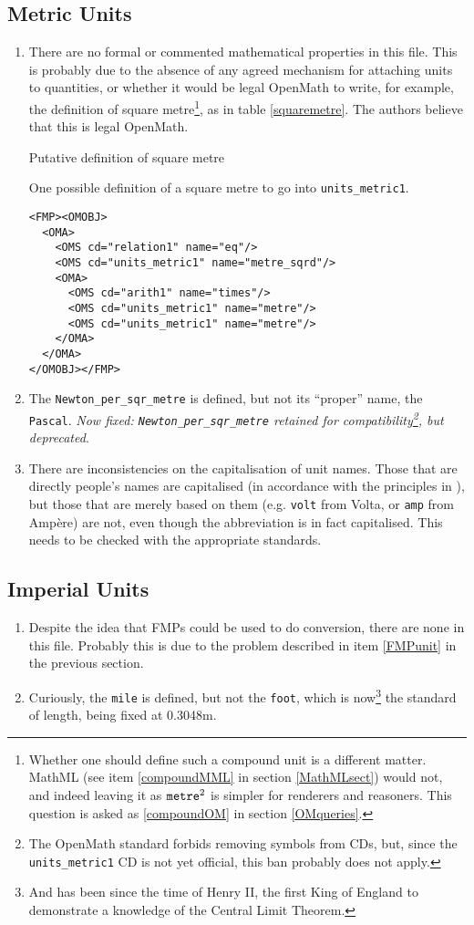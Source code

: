 \documentclass[11pt]{openmathTN}
\def\action#1{\hfill\rlap{\bf #1}}
\begin{document}
\subsection{Metric Units}\label{metricsect}
\begin{enumerate}
\item\label{FMPunit}
There are no formal or commented mathematical properties in this file. This
is probably due to the absence of any agreed mechanism for attaching units
to quantities, or whether it would be legal OpenMath to write, for example,
the definition of square metre\footnote{Whether one should define such a
compound unit is a different matter. MathML (see item \ref{compoundMML} in
section \ref{MathMLsect}) would not, and indeed leaving it as ${\tt
metre}^2$ is simpler for renderers and reasoners. This question is asked as
\ref{compoundOM} in section \ref{OMqueries}.}, as in table
\ref{squaremetre}. The authors believe that this is legal OpenMath.
\begin{table}[ht]
\caption{Putative definition of square metre}\label{squaremetre}
One possible definition of a square metre to go into \verb+units_metric1+.
\begin{verbatim}
<FMP><OMOBJ>
  <OMA>
    <OMS cd="relation1" name="eq"/>
    <OMS cd="units_metric1" name="metre_sqrd"/>
    <OMA>
      <OMS cd="arith1" name="times"/>
      <OMS cd="units_metric1" name="metre"/>
      <OMS cd="units_metric1" name="metre"/>
    </OMA>
  </OMA>
</OMOBJ></FMP>
\end{verbatim}
\end{table}
\item The \verb+Newton_per_sqr_metre+ is defined, but not its ``proper''
name, the \verb+Pascal+. {\it Now fixed: \verb+Newton_per_sqr_metre+
retained for compatibility\footnote{The OpenMath standard \cite{OMSTD}
forbids removing symbols from CDs, but, since the {\tt units\_metric1} CD
is not yet official, this ban probably does not apply.}, but
deprecated\/}.
\item There are inconsistencies on the capitalisation of unit names. Those
that are directly people's names are capitalised (in accordance with the
principles in \cite{Davenport2000b}), but those that are merely based on them
(e.g. \verb+volt+ from Volta, or {\tt amp} from Amp\`ere) are not, even
though the abbreviation is in fact capitalised. This needs to be checked
with the appropriate standards.\action{JHD}
\end{enumerate}
\subsection{Imperial Units}
\begin{enumerate}
\item Despite the idea that FMPs could be used to do conversion, there are
none in this file. Probably this is due to the problem described in item
\ref{FMPunit} in the previous section.
\item Curiously, the {\tt mile} is defined, but not the {\tt foot}, which
is now\footnote{And has been since the time of Henry II, the first King of
England to demonstrate a knowledge of the Central Limit Theorem.} the
standard of length, being fixed at 0.3048m.
\end{enumerate}
\end{document}
